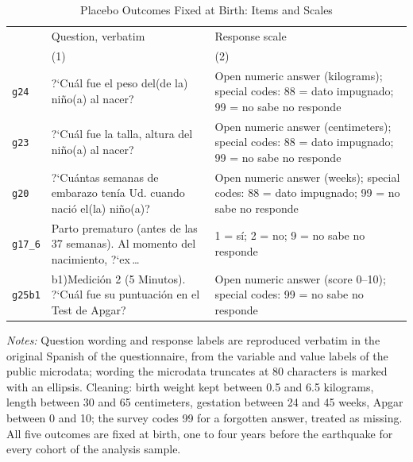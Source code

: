 \begin{table}[htbp]\centering
\caption{Placebo Outcomes Fixed at Birth: Items and Scales}
\label{tab:a_birth}
\footnotesize\renewcommand{\arraystretch}{1.0}
\begin{threeparttable}
\begin{tabular}{@{}p{68pt}p{212pt}p{150pt}@{}}
\toprule
 & Question, verbatim & Response scale \\
 & (1) & (2) \\
\midrule
\texttt{g24} & ?`Cuál fue el peso del(de la) niño(a) al nacer? & Open numeric answer (kilograms); special codes: 88 = dato impugnado; 99 = no sabe no responde \\
\addlinespace[1pt]
\texttt{g23} & ?`Cuál fue la talla, altura del niño(a) al nacer? & Open numeric answer (centimeters); special codes: 88 = dato impugnado; 99 = no sabe no responde \\
\addlinespace[1pt]
\texttt{g20} & ?`Cuántas semanas de embarazo tenía Ud. cuando nació el(la) niño(a)? & Open numeric answer (weeks); special codes: 88 = dato impugnado; 99 = no sabe no responde \\
\addlinespace[1pt]
\texttt{g17\_6} & Parto prematuro (antes de las 37 semanas). Al momento del nacimiento, ?`ex\,\dots & 1 = sí; 2 = no; 9 = no sabe no responde \\
\addlinespace[1pt]
\texttt{g25b1} & b1)Medición 2 (5 Minutos). ?`Cuál fue su puntuación en el Test de Apgar? & Open numeric answer (score 0--10); special codes: 99 = no sabe no responde \\
\bottomrule
\end{tabular}
\begin{wpnotes}
\textit{Notes:} Question wording and response labels are reproduced verbatim in the original Spanish of the questionnaire, from the variable and value labels of the public microdata; wording the microdata truncates at 80 characters is marked with an ellipsis. Cleaning: birth weight kept between 0.5 and 6.5 kilograms, length between 30 and 65 centimeters, gestation between 24 and 45 weeks, Apgar between 0 and 10; the survey codes 99 for a forgotten answer, treated as missing. All five outcomes are fixed at birth, one to four years before the earthquake for every cohort of the analysis sample.
\end{wpnotes}
\end{threeparttable}
\end{table}
